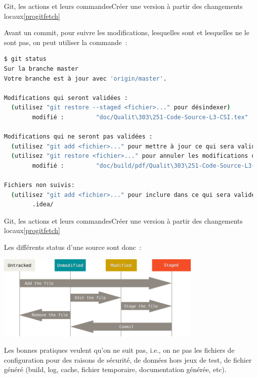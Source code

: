 \documentclass{beamer}
\begin{document}
    \begin{frame}[fragile]{Git, les actions et leurs commandes}{Créer une version à partir des changements locaux\cref{progitfetch}}
        \transdissolve

        Avant un commit, pour suivre les modifications, lesquelles sont  et lesquelles ne le sont pas, on peut utiliser la commande~:
        \begin{lstlisting}[language=sh]
$ git status
Sur la branche master
Votre branche est à jour avec 'origin/master'.

Modifications qui seront validées :
  (utilisez "git restore --staged <fichier>..." pour désindexer)
        modifié :         "doc/Qualit\303\251-Code-Source-L3-CSI.tex"

Modifications qui ne seront pas validées :
  (utilisez "git add <fichier>..." pour mettre à jour ce qui sera validé)
  (utilisez "git restore <fichier>..." pour annuler les modifications dans le répertoire de travail)
        modifié :         "doc/build/pdf/Qualit\303\251-Code-Source-L3-CSI.pdf"

Fichiers non suivis:
  (utilisez "git add <fichier>..." pour inclure dans ce qui sera validé)
        .idea/
        \end{lstlisting}

    \end{frame}

    \begin{frame}{Git, les actions et leurs commandes}{Créer une version à partir des changements locaux\cref{progitfetch}}
        \transdissolve

        Les différents status d'une source sont donc~:

        \begin{center}
            \includegraphics[width=10cm]{image/git-lifecycle}
        \end{center}

        \begin{dangercolorbox}
            Les bonnes pratiques veulent qu'on ne suit pas, i.e., on ne  pas les fichiers de configuration pour des raisons de sécurité, de données hors jeux de test, de fichier généré (build, log, cache, fichier temporaire, documentation générée, etc).
        \end{dangercolorbox}
    \end{frame}
\end{document}
